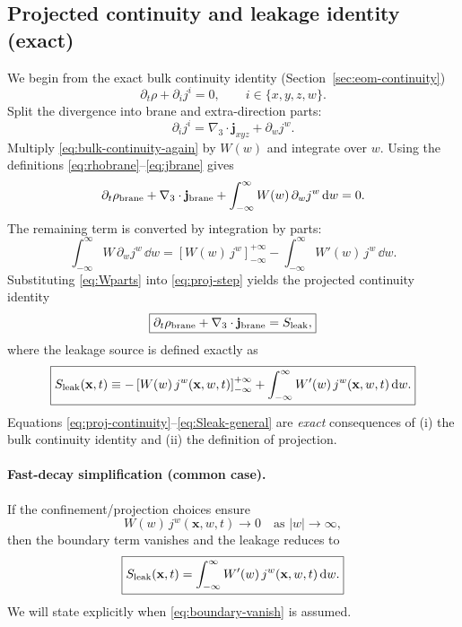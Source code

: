 \documentclass[11pt]{article}
\begin{document}
\subsection{Projected continuity and leakage identity (exact)}
\label{sec:projection-continuity}

We begin from the exact bulk continuity identity (Section~\ref{sec:eom-continuity})
\begin{equation}
\partial_t \rho + \partial_i j^i = 0,
\qquad i\in\{x,y,z,w\}.
\label{eq:bulk-continuity-again}
\end{equation}
Split the divergence into brane and extra-direction parts:
\begin{equation}
\partial_i j^i = \nabla_3\cdot \mathbf{j}_{xyz} + \partial_w j^w.
\end{equation}
Multiply \eqref{eq:bulk-continuity-again} by $W(w)$ and integrate over $w$. Using the definitions
\eqref{eq:rhobrane}--\eqref{eq:jbrane} gives
\begin{equation}
\partial_t \rho_{\rm brane} + \nabla_3\cdot \mathbf{j}_{\rm brane}
+ \int_{-\infty}^{\infty} W(w)\,\partial_w j^w\,\dd w = 0.
\label{eq:proj-step}
\end{equation}
The remaining term is converted by integration by parts:
\begin{equation}
\int_{-\infty}^{\infty} W\,\partial_w j^w\,\dd w
=
\left[W(w)\,j^w\right]_{-\infty}^{+\infty}
-
\int_{-\infty}^{\infty} W'(w)\,j^w\,\dd w.
\label{eq:Wparts}
\end{equation}
Substituting \eqref{eq:Wparts} into \eqref{eq:proj-step} yields the projected continuity identity
\begin{equation}
\boxed{
\partial_t \rho_{\rm brane} + \nabla_3\cdot \mathbf{j}_{\rm brane}
=
S_{\rm leak},
}
\label{eq:proj-continuity}
\end{equation}
where the leakage source is defined exactly as
\begin{equation}
\boxed{
S_{\rm leak}(\mathbf{x},t)
\equiv
-\left[W(w)\,j^w(\mathbf{x},w,t)\right]_{-\infty}^{+\infty}
+
\int_{-\infty}^{\infty} W'(w)\,j^w(\mathbf{x},w,t)\,\dd w.
}
\label{eq:Sleak-general}
\end{equation}
Equations \eqref{eq:proj-continuity}--\eqref{eq:Sleak-general} are \emph{exact} consequences of (i) the bulk continuity identity and (ii) the definition of projection.

\paragraph{Fast-decay simplification (common case).}
If the confinement/projection choices ensure
\begin{equation}
W(w)\,j^w(\mathbf{x},w,t)\to 0\quad\text{as }|w|\to\infty,
\label{eq:boundary-vanish}
\end{equation}
then the boundary term vanishes and the leakage reduces to
\begin{equation}
\boxed{
S_{\rm leak}(\mathbf{x},t)=\int_{-\infty}^{\infty} W'(w)\,j^w(\mathbf{x},w,t)\,\dd w.
}
\label{eq:Sleak-simplified}
\end{equation}
We will state explicitly when \eqref{eq:boundary-vanish} is assumed.
\end{document}
